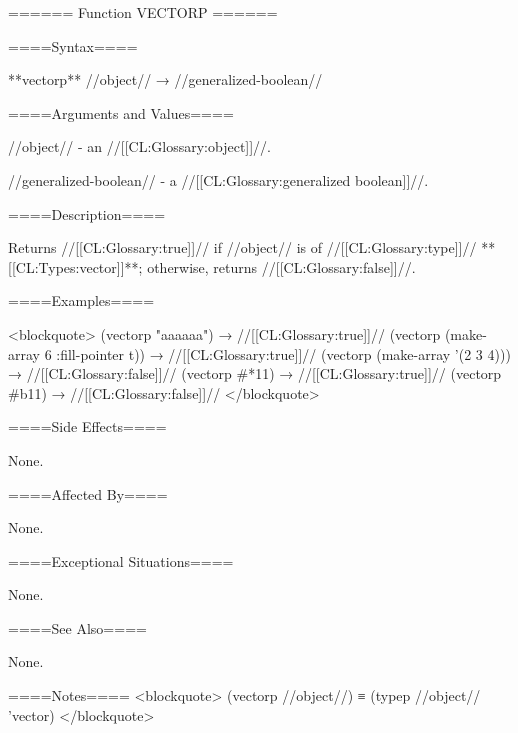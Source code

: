 ====== Function VECTORP ======

====Syntax====

**vectorp** //object// → //generalized-boolean//

====Arguments and Values====

//object// - an //[[CL:Glossary:object]]//.

//generalized-boolean// - a //[[CL:Glossary:generalized boolean]]//.

====Description====

Returns //[[CL:Glossary:true]]// if //object// is of //[[CL:Glossary:type]]// **[[CL:Types:vector]]**; otherwise, returns //[[CL:Glossary:false]]//.

====Examples====

<blockquote> (vectorp "aaaaaa") → //[[CL:Glossary:true]]// (vectorp (make-array 6 :fill-pointer t)) → //[[CL:Glossary:true]]// (vectorp (make-array '(2 3 4))) → //[[CL:Glossary:false]]// (vectorp #*11) → //[[CL:Glossary:true]]// (vectorp #b11) → //[[CL:Glossary:false]]// </blockquote>

====Side Effects====

None.

====Affected By====

None.

====Exceptional Situations====

None.

====See Also====

None.

====Notes==== <blockquote> (vectorp //object//) ≡ (typep //object// 'vector) </blockquote>


